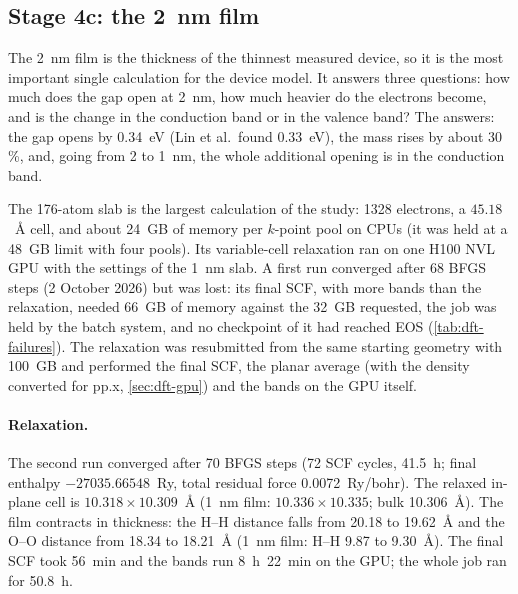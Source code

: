 \subsection{Stage 4c: the 2~nm film}
\label{sec:dft-calc-slab2}

\begin{dftplain}
The 2~nm film is the thickness of the thinnest measured device, so it is the most important single calculation for the
device model. It answers three questions: how much does the gap open at 2~nm, how much heavier do the electrons
become, and is the change in the conduction band or in the valence band? The answers: the gap opens by 0.34~eV (Lin et
al.\ found 0.33~eV), the mass rises by about 30\,\%, and, going from 2 to 1~nm, the whole additional opening is in the
conduction band.
\end{dftplain}

The 176-atom slab is the largest calculation of the study: 1328 electrons, a $45.18$~\AA{} cell, and about 24~GB of
memory per $k$-point pool on CPUs (it was held at a 48~GB limit with four pools). Its variable-cell relaxation ran on one
H100 NVL GPU with the settings of the 1~nm slab. A first run converged after 68 BFGS steps (2 October 2026) but was
lost: its final SCF, with more bands than the relaxation, needed 66~GB of memory against the 32~GB requested, the job
was held by the batch system, and no checkpoint of it had reached EOS (\cref{tab:dft-failures}). The relaxation was
resubmitted from the same starting geometry with 100~GB and performed the final SCF, the planar average (with the
density converted for pp.x, \cref{sec:dft-gpu}) and the bands on the GPU itself.

\paragraph{Relaxation.} The second run converged after 70 BFGS steps (72 SCF cycles, 41.5~h; final enthalpy
$-27035.66548$~Ry, total residual force 0.0072~Ry/bohr). The relaxed in-plane cell is $10.318\times10.309$~\AA{} (1~nm
film: $10.336\times10.335$; bulk 10.306~\AA). The film contracts in thickness: the H--H distance falls from 20.18 to
19.62~\AA{} and the O--O distance from 18.34 to 18.21~\AA{} (1~nm film: H--H 9.87 to 9.30~\AA). The final SCF took
56~min and the bands run 8~h~22~min on the GPU; the whole job ran for 50.8~h.


